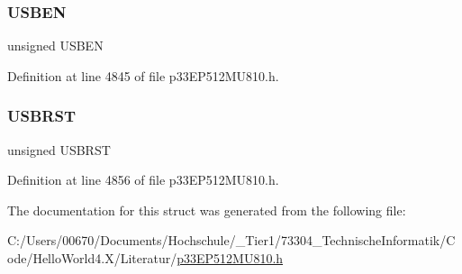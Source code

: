 \subsubsection{\texorpdfstring{U\+S\+B\+EN}{USBEN}}
{\footnotesize\ttfamily unsigned U\+S\+B\+EN}



Definition at line 4845 of file p33\+E\+P512\+M\+U810.\+h.

\mbox{\label{structtag_u1_c_o_n_b_i_t_s_a5c8c28a70892e8f1b63aaa1cafa2ea70}} 
\subsubsection{\texorpdfstring{U\+S\+B\+R\+ST}{USBRST}}
{\footnotesize\ttfamily unsigned U\+S\+B\+R\+ST}



Definition at line 4856 of file p33\+E\+P512\+M\+U810.\+h.



The documentation for this struct was generated from the following file\+:\begin{DoxyCompactItemize}
\item 
C\+:/\+Users/00670/\+Documents/\+Hochschule/\+\_\+\+Tier1/73304\+\_\+\+Technische\+Informatik/\+Code/\+Hello\+World4.\+X/\+Literatur/\hyperlink{p33_e_p512_m_u810_8h}{p33\+E\+P512\+M\+U810.\+h}\end{DoxyCompactItemize}
